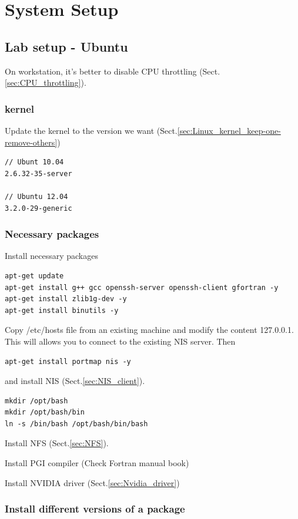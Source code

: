 \chapter{System Setup}

\section{Lab setup - Ubuntu}

On workstation, it's better to disable CPU throttling
(Sect.\ref{sec:CPU_throttling}).


\subsection{kernel}

Update the kernel to the version we want (Sect.\ref{sec:Linux_kernel_keep-one-remove-others})
\begin{verbatim}
// Ubunt 10.04
2.6.32-35-server

// Ubuntu 12.04
3.2.0-29-generic
\end{verbatim}  


\subsection{Necessary packages}

Install necessary packages
\begin{verbatim}
apt-get update
apt-get install g++ gcc openssh-server openssh-client gfortran -y
apt-get install zlib1g-dev -y
apt-get install binutils -y
\end{verbatim}

Copy /etc/hosts file from an existing machine and modify the content 127.0.0.1.
This will allows you to connect to the existing NIS server. Then
\begin{verbatim}
apt-get install portmap nis -y
\end{verbatim}
and install NIS (Sect.\ref{sec:NIS_client}). 

\begin{verbatim}
mkdir /opt/bash
mkdir /opt/bash/bin
ln -s /bin/bash /opt/bash/bin/bash 
\end{verbatim}
Install NFS (Sect.\ref{sec:NFS}).

Install PGI compiler (Check Fortran manual book)

Install NVIDIA driver (Sect.\ref{sec:Nvidia_driver})

\subsection{Install different versions of a package}

